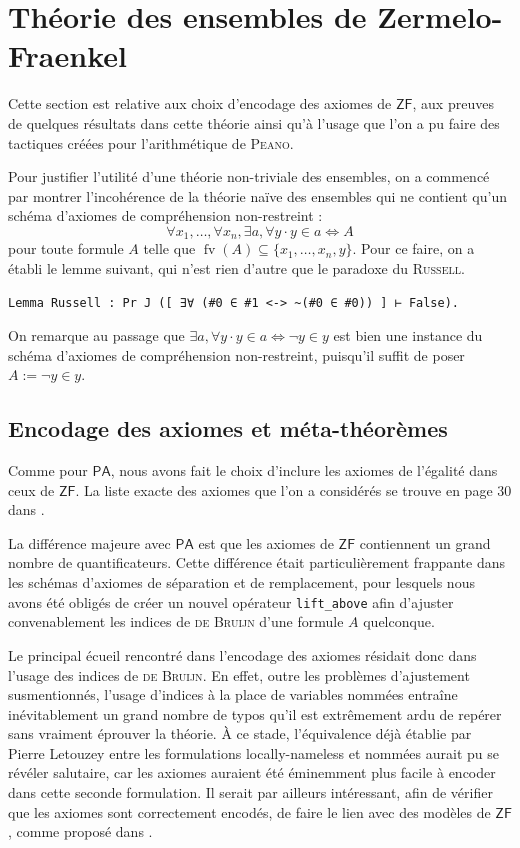 \documentclass[a4paper]{article}
\DeclareMathOperator{\fv}{\mathrm{fv}}
\newcommand{\PA}{\mathsf{PA}}
\newcommand{\ZF}{\mathsf{ZF}}
\theoremstyle{remark}
\theoremstyle{remark}
\theoremstyle{remark}
\theoremstyle{definition}
\theoremstyle{definition}
\theoremstyle{definition}
\begin{document}
\newpage


\section{Théorie des ensembles de {\sc Zermelo-Fraenkel}}

Cette section est relative aux choix d'encodage des axiomes de $\ZF$, aux preuves de quelques résultats dans cette théorie ainsi qu'à l'usage que l'on a pu faire des tactiques créées pour l'arithmétique de \textsc{Peano}.

Pour justifier l'utilité d'une théorie non-triviale des ensembles, on a commencé par montrer l'incohérence de la théorie naïve des ensembles qui ne contient qu'un schéma d'axiomes de compréhension non-restreint : \[ \forall x_1, \ldots, \forall x_n, \exists a, \forall y \cdot y \in a \Leftrightarrow A \] pour toute formule $A$ telle que $\fv(A) \subseteq \{ x_1, \ldots, x_n, y \}$. Pour ce faire, on a établi le lemme suivant, qui n'est rien d'autre que le paradoxe du \textsc{Russell}. \begin{verbatim}
Lemma Russell : Pr J ([ ∃∀ (#0 ∈ #1 <-> ~(#0 ∈ #0)) ] ⊢ False).
\end{verbatim}
On remarque au passage que $\exists a, \forall y \cdot y \in a \Leftrightarrow \neg y \in y$ est bien une instance du schéma d'axiomes de compréhension non-restreint, puisqu'il suffit de poser $A := \neg y \in y$.

\subsection{Encodage des axiomes et méta-théorèmes}

Comme pour $\PA$, nous avons fait le choix d'inclure les axiomes de l'égalité dans ceux de $\ZF$. La liste exacte des axiomes que l'on a considérés se trouve en page 30 dans \cite{poly}.

La différence majeure avec $\PA$ est que les axiomes de $\ZF$ contiennent un grand nombre de quantificateurs. Cette différence était particulièrement frappante dans les schémas d'axiomes de séparation et de remplacement, pour lesquels nous avons été obligés de créer un nouvel opérateur \verb+lift_above+ afin d'ajuster convenablement les indices de \textsc{de Bruijn} d'une formule $A$ quelconque.
\smallskip

Le principal écueil rencontré dans l'encodage des axiomes résidait donc dans l'usage des indices de \textsc{de Bruijn}. En effet, outre les problèmes d'ajustement susmentionnés, l'usage d'indices à la place de variables nommées entraîne inévitablement un grand nombre de typos qu'il est extrêmement ardu de repérer sans vraiment éprouver la théorie. \`A ce stade, l'équivalence déjà établie par Pierre Letouzey entre les formulations locally-nameless et nommées aurait pu se révéler salutaire, car les axiomes auraient été éminemment plus facile à encoder dans cette seconde formulation. Il serait par ailleurs intéressant, afin de vérifier que les axiomes sont correctement encodés, de faire le lien avec des modèles de $\ZF$, comme proposé dans \cite{zfmod}.
\end{document}
